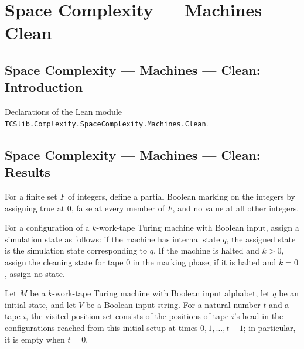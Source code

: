 \section{Space Complexity --- Machines --- Clean}
\subsection*{Space Complexity --- Machines --- Clean: Introduction}

Declarations of the Lean module \texttt{TCSlib.Complexity.SpaceComplexity.Machines.Clean}.

\subsection*{Space Complexity --- Machines --- Clean: Results}

\begin{definition}
\label{Complexity.LogProg.markSet}
\leanok
For a finite set $F$ of integers, define a partial Boolean marking on the integers by
assigning true at $0$, false at every member of $F$, and no value at all other integers.
\end{definition}

\begin{definition}
\label{Complexity.LogProg.simSt}
\leanok
{}
For a configuration of a $k$-work-tape Turing machine with Boolean input, assign a
simulation state as follows: if the machine has internal state $q$, the assigned state
is the simulation state corresponding to $q$. If the machine is halted and $k>0$, assign
the cleaning state for tape $0$ in the marking phase; if it is halted and $k=0$, assign
no state.
\end{definition}

\begin{definition}
\label{Complexity.LogProg.visB}
\leanok
{}
Let $M$ be a $k$-work-tape Turing machine with Boolean input alphabet, let $q$ be an
initial state, and let $V$ be a Boolean input string. For a natural number $t$ and a
tape $i$, the visited-position set consists of the positions of tape $i$'s head in the
configurations reached from this initial setup at times $0,1,\ldots,t-1$; in particular,
it is empty when $t=0$.
\end{definition}


